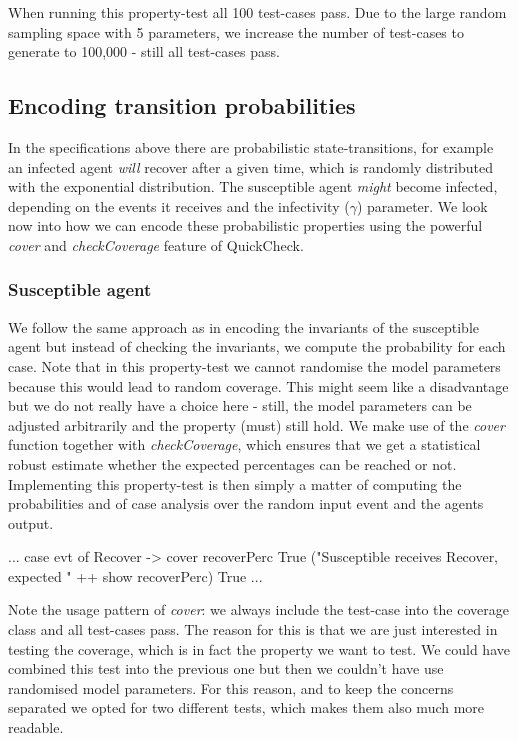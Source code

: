 When running this property-test all 100 test-cases pass. Due to the large random sampling space with 5 parameters, we increase the number of test-cases to generate to 100,000 - still all test-cases pass.

\subsection{Encoding transition probabilities}
In the specifications above there are probabilistic state-transitions, for example an infected agent \textit{will} recover after a given time, which is randomly distributed with the exponential distribution. The susceptible agent \textit{might} become infected, depending on the events it receives and the infectivity ($\gamma$) parameter. We look now into how we can encode these probabilistic properties using the powerful \textit{cover} and \textit{checkCoverage} feature of QuickCheck.

\subsubsection{Susceptible agent}
We follow the same approach as in encoding the invariants of the susceptible agent but instead of checking the invariants, we compute the probability for each case. Note that in this property-test we cannot randomise the model parameters because this would lead to random coverage. This might seem like a disadvantage but we do not really have a choice here - still, the model parameters can be adjusted arbitrarily and the property (must) still hold. %
We make use of the \textit{cover} function together with \textit{checkCoverage}, which ensures that we get a statistical robust estimate whether the expected percentages can be reached or not. Implementing this property-test is then simply a matter of computing the probabilities and of case analysis over the random input event and the agents output.

\begin{HaskellCode}
...
case evt of 
  Recover -> 
    cover recoverPerc True 
     ("Susceptible receives Recover, expected " ++ show recoverPerc) True
...
\end{HaskellCode}

Note the usage pattern of \textit{cover}: we always include the test-case into the coverage class and all test-cases pass. The reason for this is that we are just interested in testing the coverage, which is in fact the property we want to test. We could have combined this test into the previous one but then we couldn't have use randomised model parameters. For this reason, and to keep the concerns separated we opted for two different tests, which makes them also much more readable.

